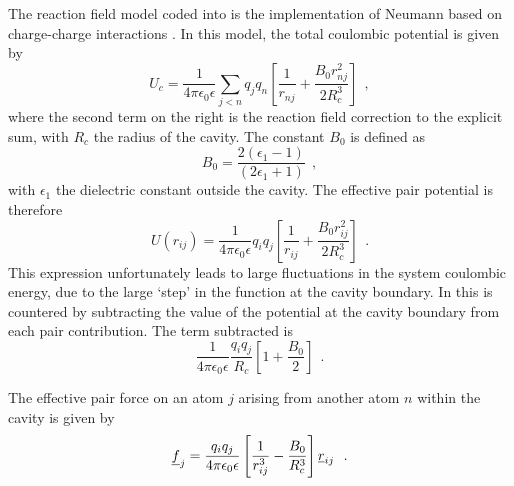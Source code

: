 The reaction field model coded into \D is the implementation of
Neumann based on charge-charge interactions \cite{neumann-85a}.
In this model, the total coulombic potential is given by
\begin{equation}
U_{c} = \frac{1}{4\pi\epsilon_{0}\epsilon} \sum_{j<n} q_{j}q_{n} \left[
\frac{1}{r_{nj}} + \frac{B_{0}r_{nj}^{2}}{2 R_{c}^{3}} \right]~~,
\end{equation}
where the second term on the right is the reaction field
correction to the explicit sum, with $R_{c}$ the radius of the
cavity.  The constant $B_{0}$ is defined as
\begin{equation}
B_{0} = \frac{2(\epsilon_{1}-1)}{(2\epsilon_{1}+1)}~~,
\end{equation}
with $\epsilon_{1}$ the dielectric constant outside the cavity.
The effective pair potential is therefore
\begin{equation}
U(r_{ij}) = \frac{1}{4\pi\epsilon_{0}\epsilon} q_{i}q_{j} \left[
\frac{1}{r_{ij}} + \frac{B_{0}r_{ij}^{2}}{2 R_{c}^{3}} \right]~~.
\end{equation}
This expression unfortunately leads to large fluctuations in the
system coulombic energy, due to the large `step' in the function
at the cavity boundary.  In \D this is countered by subtracting
the value of the potential at the cavity boundary from each pair
contribution.  The term subtracted is
\begin{equation}
\frac{1}{4\pi\epsilon_{0}\epsilon} \frac{q_{i}q_{j}}{R_{c}} \left[
1+\frac{B_{0}}{2} \right]~~.
\end{equation}

The effective pair force on an atom $j$ arising from another atom
$n$ within the cavity is given by
\begin{equation}
\mbox{$\underline{f}$}_{j}=\frac{q_{i}q_{j}}{4\pi\epsilon_{0}\epsilon}\left[
\frac{1}{r_{ij}^{3}}-\frac{B_{0}}{R_{c}^{3}}\right] \mbox{$\underline{r}$}_{ij}~~.
\end{equation}

